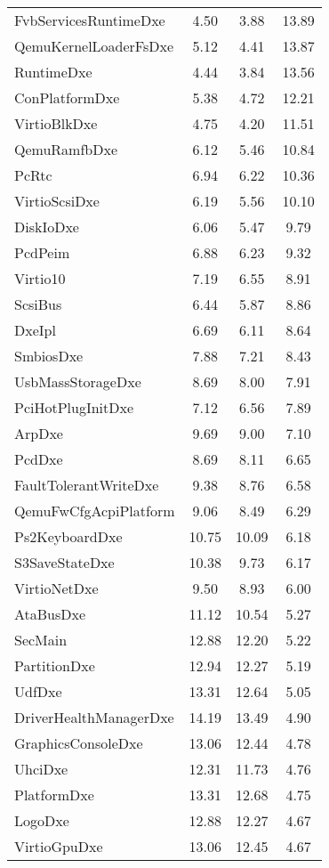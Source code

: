 \begin{longtable}{l c c c}
  FvbServicesRuntimeDxe & 4.50 & 3.88 & 13.89\\
  QemuKernelLoaderFsDxe & 5.12 & 4.41 & 13.87\\
  RuntimeDxe & 4.44 & 3.84 & 13.56\\
  ConPlatformDxe & 5.38 & 4.72 & 12.21\\
  VirtioBlkDxe & 4.75 & 4.20 & 11.51\\
  QemuRamfbDxe & 6.12 & 5.46 & 10.84\\
  PcRtc & 6.94 & 6.22 & 10.36\\
  VirtioScsiDxe & 6.19 & 5.56 & 10.10\\
  DiskIoDxe & 6.06 & 5.47 & 9.79\\
  PcdPeim & 6.88 & 6.23 & 9.32\\
  Virtio10 & 7.19 & 6.55 & 8.91\\
  ScsiBus & 6.44 & 5.87 & 8.86\\
  DxeIpl & 6.69 & 6.11 & 8.64\\
  SmbiosDxe & 7.88 & 7.21 & 8.43\\
  UsbMassStorageDxe & 8.69 & 8.00 & 7.91\\
  PciHotPlugInitDxe & 7.12 & 6.56 & 7.89\\
  ArpDxe & 9.69 & 9.00 & 7.10\\
  PcdDxe & 8.69 & 8.11 & 6.65\\
  FaultTolerantWriteDxe & 9.38 & 8.76 & 6.58\\
  QemuFwCfgAcpiPlatform & 9.06 & 8.49 & 6.29\\
  Ps2KeyboardDxe & 10.75 & 10.09 & 6.18\\
  S3SaveStateDxe & 10.38 & 9.73 & 6.17\\
  VirtioNetDxe & 9.50 & 8.93 & 6.00\\
  AtaBusDxe & 11.12 & 10.54 & 5.27\\
  SecMain & 12.88 & 12.20 & 5.22\\
  PartitionDxe & 12.94 & 12.27 & 5.19\\
  UdfDxe & 13.31 & 12.64 & 5.05\\
  DriverHealthManagerDxe & 14.19 & 13.49 & 4.90\\
  GraphicsConsoleDxe & 13.06 & 12.44 & 4.78\\
  UhciDxe & 12.31 & 11.73 & 4.76\\
  PlatformDxe & 13.31 & 12.68 & 4.75\\
  LogoDxe & 12.88 & 12.27 & 4.67\\
  VirtioGpuDxe & 13.06 & 12.45 & 4.67\\

\end{longtable}
